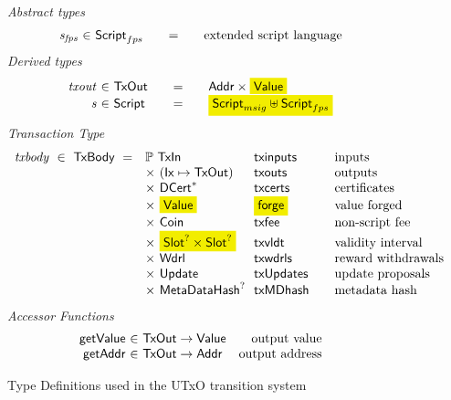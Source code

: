 \begin{figure*}[t!]
  \emph{Abstract types}
  \begin{equation*}
    \begin{array}{r@{~\in~}l@{\qquad=\qquad}lr}
      \var{s_{fps}} & \ScriptMPS & \text{extended script language}
      \\
    \end{array}
  \end{equation*}
  \emph{Derived types}
  \begin{equation*}
    \begin{array}{r@{~\in~}l@{\qquad=\qquad}lr}
      \var{txout} & \TxOut & \Addr \times \hldiff{\Value} \\
      \var{s} & \Script & \hldiff{\ScriptMSig \uniondistinct \ScriptMPS}
      \\
    \end{array}
  \end{equation*}
  \emph{Transaction Type}
  \begin{equation*}
    \begin{array}{r@{~~}l@{~~}l@{\qquad}l}
      \var{txbody} ~\in~ \TxBody ~=~
      & \powerset{\TxIn} & \fun{txinputs}& \text{inputs}\\
      &\times ~(\Ix \mapsto \TxOut) & \fun{txouts}& \text{outputs}\\
      & \times~ \seqof{\DCert} & \fun{txcerts}& \text{certificates}\\
       & \times ~\hldiff{\Value}  & \hldiff{\fun{forge}} &\text{value forged}\\
       & \times ~\Coin & \fun{txfee} &\text{non-script fee}\\
       & \times ~\hldiff{\Slot^? \times \Slot^?} & \fun{txvldt} & \text{validity interval}\\
       & \times~ \Wdrl  & \fun{txwdrls} &\text{reward withdrawals}\\
       & \times ~\Update  & \fun{txUpdates} & \text{update proposals}\\
       & \times ~\MetaDataHash^? & \fun{txMDhash} & \text{metadata hash}
    \end{array}
  \end{equation*}
  \emph{Accessor Functions}
  \begin{equation*}
    \begin{array}{r@{~\in~}lr}
      \fun{getValue} & \TxOut \to \Value & \text{output value} \\
      \fun{getAddr} & \TxOut \to \Addr & \text{output address}
    \end{array}
  \end{equation*}
  \caption{Type Definitions used in the UTxO transition system}
  \label{fig:defs:utxo-shelley}
\end{figure*}

